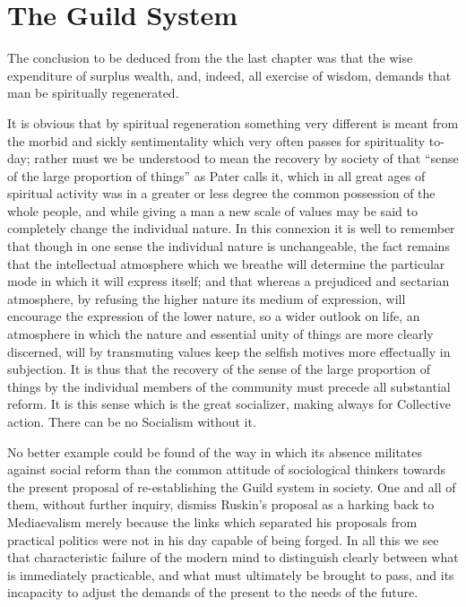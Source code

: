 \documentclass{book}
\begin{document}
\chapter{The Guild System}
\label{chapter-4}
The conclusion to be deduced from the the last chapter was that the wise expenditure of surplus wealth, and, indeed, all exercise of wisdom, demands that man be spiritually regenerated.

It is obvious that by spiritual regeneration something very different is meant from the morbid and sickly sentimentality which very often passes for spirituality to-day; rather must we be understood to mean the recovery by society of that “sense of the large proportion of things” as Pater calls it, which in all great ages of spiritual activity was in a greater or less degree the common possession of the whole people, and while giving a man a new scale of values may be said to completely change the individual nature. In this connexion it is well to remember that though in one sense the individual nature is unchangeable, the fact remains that the intellectual atmosphere which we breathe will determine the particular mode in which it will express itself; and that whereas a prejudiced and sectarian atmosphere, by refusing the higher nature its medium of expression, will encourage the expression of the lower nature, so a wider outlook on life, an atmosphere in which the nature and essential unity of things are more clearly discerned, will by transmuting values keep the selfish motives more effectually in subjection. It is thus that the recovery of the sense of the large proportion of things by the individual members of the community must precede all substantial reform. It is this sense which is the great socializer, making always for Collective action. There can be no Socialism without it.

No better example could be found of the way in which its absence militates against social reform than the common attitude of sociological thinkers towards the present proposal of re-establishing the Guild system in society. One and all of them, without further inquiry, dismiss Ruskin’s proposal as a harking back to Mediaevalism merely because the links which separated his proposals from practical politics were not in his day capable of being forged. In all this we see that characteristic failure of the modern mind to distinguish clearly between what is immediately practicable, and what must ultimately be brought to pass, and its incapacity to adjust the demands of the present to the needs of the future.
\end{document}
